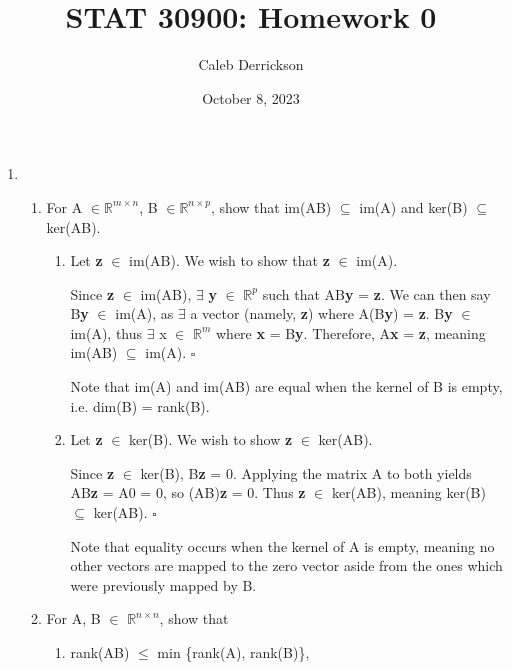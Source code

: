\documentclass[12pt]{article}
\title{STAT 30900: Homework 0}
\author{Caleb Derrickson}
\date{October 8, 2023}
\newcommand{\hop}{\vspace{1mm}}
\newcommand{\jump}{\vspace{5mm}}
\newcommand{\R}{\mathbb{R}}
\newcommand{\bt}{\textbf}
\begin{document}
\onehalfspacing
\maketitle
\begin{enumerate}[leftmargin=\labelsep]

\item 
\begin{enumerate}
    \hop
    \item For A $\in \R ^{m \times n}$, B $\in \R^{ n \times p}$, show that im(AB) $\subseteq$ im(A) and ker(B) $\subseteq$ ker(AB).
        \jump
        
    \begin{enumerate}
        \item Let \bt{z} $\in$ im(AB). We wish to show that \bt{z} $\in$ im(A). 
    \hop
    
    Since \bt{z} $\in$ im(AB), $\exists$ \bt{y} $\in$ $\R^{p}$ such that AB\bt{y} = \bt{z}. We can then say B\bt{y} $\in$ im(A), as $\exists$ a vector (namely, \bt{z}) where A(B\bt{y}) = \bt{z}. B\bt{y} $\in$ im(A), thus $\exists$ x $\in$ $\R^{m}$ where \bt{x} = B\bt{y}. Therefore, A\bt{x} = \bt{z}, meaning im(AB) $\subseteq$ im(A). $\square$

    Note that im(A) and im(AB) are equal when the kernel of B is empty, i.e. dim(B) = rank(B).
    
    \hop
    
    \item Let \textbf{z} $\in$ ker(B). We wish to show \textbf{z} $\in$ ker(AB).
    \hop

    Since \textbf{z} $\in$ ker(B), B\textbf{z} = 0. Applying the matrix A to both yields AB\textbf{z} = A0 = 0, so (AB)\textbf{z} = 0. Thus \textbf{z} $\in$ ker(AB), meaning ker(B) $\subseteq$ ker(AB). $\square$

    \hop
    Note that equality occurs when the kernel of A is empty, meaning no other vectors are mapped to the zero vector aside from the ones which were previously mapped by B.
    \end{enumerate}    

    \jump

    \item For A, B $\in$ $\R^{n\times n}$, show that
    \begin{enumerate}
        \item rank(AB) $\leq$ min \{rank(A), rank(B)\}, 
        \jump


\end{enumerate}
\end{enumerate}
\end{enumerate}
\end{document}
